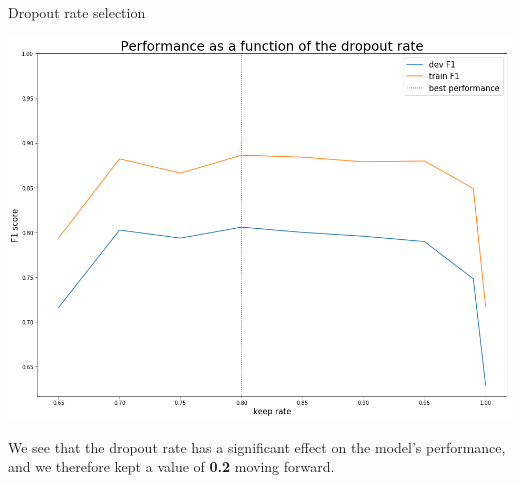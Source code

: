 \documentclass[final]{beamer}
\newlength{\onecolwid}
\newlength{\twocolwid}
\begin{document}
\begin{frame}[t]
\begin{columns}[t]
\begin{column}{\twocolwid}
\begin{columns}[t,totalwidth=\twocolwid]
\begin{column}{\onecolwid}
\begin{block}{Dropout rate selection}
\begin{center}
  \includegraphics[scale=0.5]{figs/dr_graph.png}
\end{center}

We see that the dropout rate has a significant effect on the model's performance, and we therefore kept a value of \textbf{0.2} moving forward.

\end{block}


\end{column} %

\end{columns} %


%
%



\end{column}
\end{columns}
\end{frame}
\end{document}
